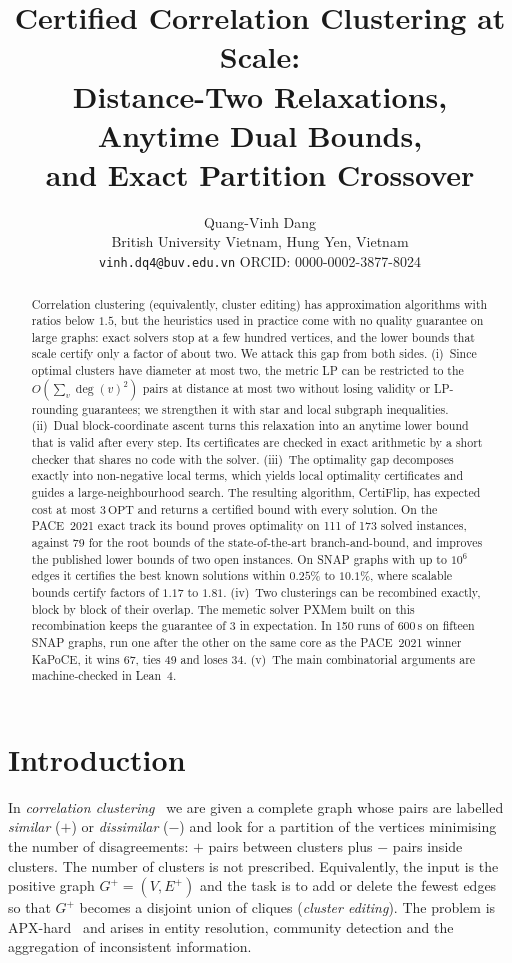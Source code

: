 \documentclass[11pt]{article}
\title{Certified Correlation Clustering at Scale:\\
Distance-Two Relaxations, Anytime Dual Bounds,\\ and Exact Partition Crossover}
\author{Quang-Vinh Dang\\
British University Vietnam, Hung Yen, Vietnam\\
\texttt{vinh.dq4@buv.edu.vn} \quad ORCID: 0000-0002-3877-8024}
\date{}
\theoremstyle{definition}
\newcommand{\OPT}{\mathrm{OPT}}
\newcommand{\Ep}{E^{+}}
\begin{document}
\maketitle

\begin{abstract}
Correlation clustering (equivalently, cluster editing) has approximation
algorithms with ratios below $1.5$, but the heuristics used in practice come
with no quality guarantee on large graphs: exact solvers stop at a few
hundred vertices, and the lower bounds that scale certify only a factor of
about two.  We attack this gap from both sides.
(i)~Since optimal clusters have diameter at most two, the metric LP can be
restricted to the $O(\sum_v\deg(v)^2)$ pairs at distance at most two without
losing validity or LP-rounding guarantees; we strengthen it with star and
local subgraph inequalities.
(ii)~Dual block-coordinate ascent turns this relaxation into an anytime lower
bound that is valid after every step.  Its certificates are checked in exact
arithmetic by a short checker that shares no code with the solver.
(iii)~The optimality gap decomposes exactly into non-negative local terms,
which yields local optimality certificates and guides a large-neighbourhood
search.  The resulting algorithm, CertiFlip, has expected cost at most
$3\,\OPT$ and returns a certified bound with every solution.  On the PACE~2021
exact track its bound proves optimality on 111 of 173 solved instances,
against 79 for the root bounds of the state-of-the-art branch-and-bound, and
improves the published lower bounds of two open instances.  On SNAP graphs
with up to $10^6$ edges it certifies the best known solutions within
$0.25\%$ to $10.1\%$, where scalable bounds certify factors of $1.17$ to $1.81$.
(iv)~Two clusterings can be recombined exactly, block by block of their
overlap.  The memetic solver PXMem built on this recombination keeps the
guarantee of $3$ in expectation.  In 150 runs of 600\,s on fifteen SNAP
graphs, run one after the other on the same core as the PACE~2021 winner
KaPoCE, it wins 67, ties 49 and loses 34.
(v)~The main combinatorial arguments are machine-checked in Lean~4.
\end{abstract}

\section{Introduction}

In \emph{correlation clustering}~\citep{BansalBC04} we are given a complete
graph whose pairs are labelled \emph{similar} ($+$) or \emph{dissimilar}
($-$) and look for a partition of the vertices minimising the number of
disagreements: $+$ pairs between clusters plus $-$ pairs inside clusters.  The
number of clusters is not prescribed.  Equivalently, the input is the positive
graph $G^+=(V,\Ep)$ and the task is to add or delete the fewest edges so that
$G^+$ becomes a disjoint union of cliques (\emph{cluster editing}).  The
problem is APX-hard~\citep{CharikarGW05} and arises in entity resolution,
community detection and the aggregation of inconsistent information.
\end{document}
